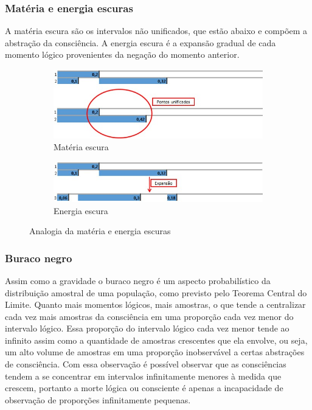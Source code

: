 \subsubsection{Matéria e energia escuras}
A matéria escura são os intervalos não unificados, que estão abaixo e compõem a abstração da consciência. A energia escura é a expansão gradual de cada momento lógico provenientes da negação do momento anterior.

\begin{figure}[H]
\centering
	\begin{subfigure}[H]{1\linewidth}
	\centering
	\includegraphics[width=1\linewidth]{sections/images/consciousness_dark_matter.jpg}
	\caption{Matéria escura}
	\label{fig:consciousness_dark_matter}
	\end{subfigure}
	\begin{subfigure}[H]{1\linewidth}
	\centering
	\includegraphics[width=1\linewidth]{sections/images/consciousness_dark_energy.jpg}
	\caption{Energia escura}
	\label{fig:consciousness_dark_energy}
	\end{subfigure}%
\caption{Analogia da matéria e energia escuras}

\end{figure}

\subsubsection{Buraco negro}
Assim como a gravidade o buraco negro é um aspecto probabilístico da distribuição amostral de uma população, como previsto pelo Teorema Central do Limite. Quanto mais momentos lógicos, mais amostras, o que tende a centralizar cada vez mais amostras da consciência em uma proporção cada vez menor do intervalo lógico. Essa proporção do intervalo lógico cada vez menor tende ao infinito assim como a quantidade de amostras crescentes que ela envolve, ou seja, um alto volume de amostras em uma proporção inobservável a certas abstrações de consciência. Com essa observação é possível observar que as consciências tendem a se concentrar em intervalos infinitamente menores à medida que crescem, portanto a morte lógica ou consciente é apenas a incapacidade de observação de proporções infinitamente pequenas.

